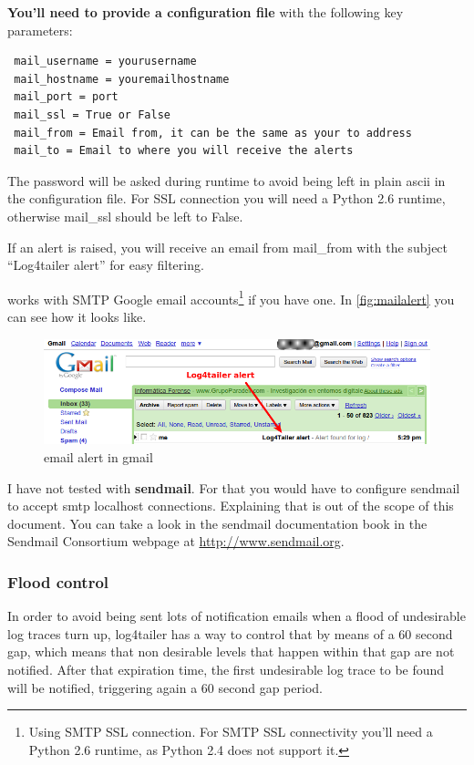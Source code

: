 \textbf{You'll need to provide a configuration file} with the following key parameters:

\begin{config}
\begin{verbatim}
 mail_username = yourusername
 mail_hostname = youremailhostname 
 mail_port = port
 mail_ssl = True or False
 mail_from = Email from, it can be the same as your to address 
 mail_to = Email to where you will receive the alerts
\end{verbatim}
\end{config}

\noindent
The password will be asked during runtime to avoid being left in plain ascii in
the configuration file. For SSL connection you will need a Python 2.6 runtime,
otherwise mail\_ssl should be left to False.

If an alert is raised, you will receive an email from mail\_from with the
subject ``Log4tailer alert'' for easy filtering.

\logftailer{} works with SMTP Google email accounts\footnote{Using SMTP SSL
connection. For SMTP SSL connectivity you'll need a Python 2.6 runtime, as
Python 2.4 does not support it.} if you have one.  In \autoref{fig:mailalert}
you can see how it looks like.

\begin{figure}[hb]
\includegraphics[scale=0.55]{emailalert.png}
\caption{\logftailer{} email alert in gmail}\label{fig:mailalert}
\end{figure}

I have not tested \logftailer{} with \textbf{sendmail}. For that you would have
to configure sendmail to accept smtp localhost connections.  Explaining that is
out of the scope of this document. You can take a look in the sendmail
documentation book in the Sendmail Consortium webpage at
\href{http://www.sendmail.org}{http://www.sendmail.org}.

\subsubsection{Flood control}
In order to avoid being sent lots of notification emails when a flood of
undesirable log traces turn up, log4tailer has a way to control that by means
of a 60 second gap, which means that non desirable levels that happen within
that gap are not notified. After that expiration time, the first undesirable
log trace to be found will be notified, triggering again a 60 second gap
period. 
 

